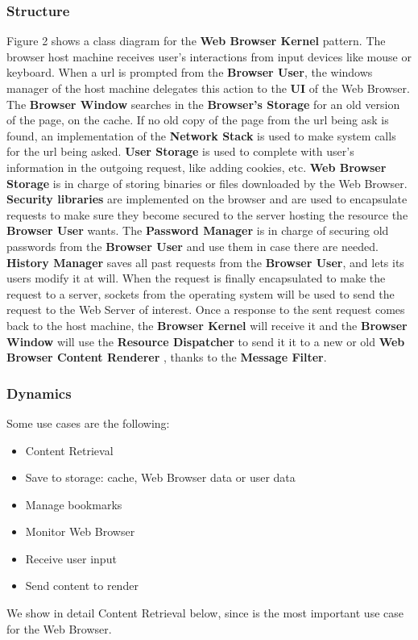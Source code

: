 \documentclass[prodmode,hillsideplop]{acmlarge}
\begin{document}
\subsubsection{Structure}
Figure 2 shows a class diagram for the \textbf{Web Browser Kernel} pattern. The browser host machine receives user’s interactions from input devices like mouse or keyboard. When a url is prompted from the \textbf{Browser User}, the windows manager of the host machine delegates this action to the \textbf{UI} of the Web Browser. The \textbf{Browser Window} searches in the \textbf{Browser’s Storage} for an old version of the page, on the cache. If no old copy of the page from the url being ask is found, an implementation of the \textbf{Network Stack} is used to make system calls for the url being asked. \textbf{User Storage} is used to complete with user's information in the outgoing request, like adding cookies, etc. \textbf{Web Browser Storage} is in charge of storing binaries or files downloaded by the Web Browser. \textbf{Security libraries} are implemented on the browser and are used to encapsulate requests to make sure they become secured to the server hosting the resource the \textbf{Browser User} wants. The \textbf{Password Manager} is in charge of securing old passwords from the \textbf{Browser User} and use them in case there are needed. \textbf{History Manager} saves all past requests from the \textbf{Browser User}, and lets its users modify it at will. When the request is finally encapsulated to make the request to a server, sockets from the operating system will be used to send the request to the Web Server of interest. Once a response to the sent request comes back to the host machine, the \textbf{Browser Kernel} will receive it and the \textbf{Browser Window} will use the \textbf{Resource Dispatcher} to send it it to a new or old \textbf{Web Browser Content Renderer} \cite{silva2015,silva2016a}, thanks to the \textbf{Message Filter}. 

\subsubsection{Dynamics}
Some use cases are the following:
  \begin{itemize}
      \item Content Retrieval
      \item Save to storage: cache, Web Browser data or user data
      \item Manage bookmarks
      \item Monitor Web Browser
      \item Receive user input
      \item Send content to render
  \end{itemize}
We show in detail Content Retrieval below, since is the most important use case for the Web Browser.
\end{document}
